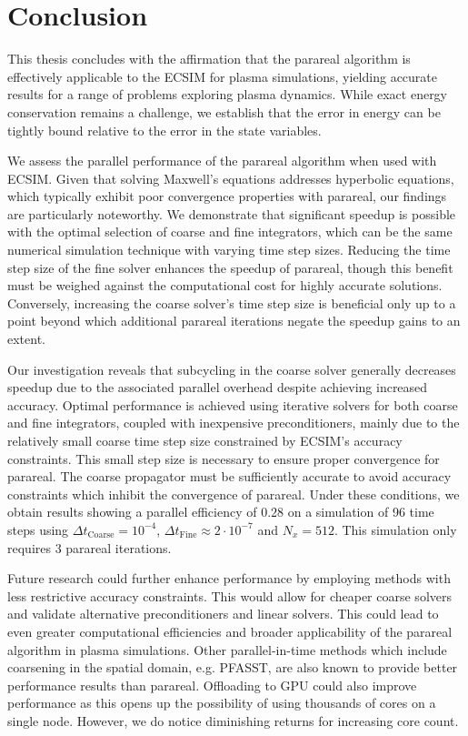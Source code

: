 \chapter{Conclusion}
\label{cha: conclusion}
This thesis concludes with the affirmation that the parareal algorithm is effectively applicable to the ECSIM for plasma simulations, yielding accurate results for a range of problems exploring plasma dynamics. While exact energy conservation remains a challenge, we establish that the error in energy can be tightly bound relative to the error in the state variables.

We assess the parallel performance of the parareal algorithm when used with ECSIM. Given that solving Maxwell's equations addresses hyperbolic equations, which typically exhibit poor convergence properties with parareal, our findings are particularly noteworthy. We demonstrate that significant speedup is possible with the optimal selection of coarse and fine integrators, which can be the same numerical simulation technique with varying time step sizes. Reducing the time step size of the fine solver enhances the speedup of parareal, though this benefit must be weighed against the computational cost for highly accurate solutions. Conversely, increasing the coarse solver's time step size is beneficial only up to a point beyond which additional parareal iterations negate the speedup gains to an extent.

Our investigation reveals that subcycling in the coarse solver generally decreases speedup due to the associated parallel overhead despite achieving increased accuracy. Optimal performance is achieved using iterative solvers for both coarse and fine integrators, coupled with inexpensive preconditioners, mainly due to the relatively small coarse time step size constrained by ECSIM's accuracy constraints. This small step size is necessary to ensure proper convergence for parareal. The coarse propagator must be sufficiently accurate to avoid accuracy constraints which inhibit the convergence of parareal. Under these conditions, we obtain results showing a parallel efficiency of $0.28$ on a simulation of 96 time steps using $\Delta t_\mathrm{Coarse} = 10^{-4}$, $\Delta t_\mathrm{Fine} \approx 2\cdot 10^{-7}$ and $N_x = 512$. This simulation only requires $3$ parareal iterations.

Future research could further enhance performance by employing methods with less restrictive accuracy constraints. This would allow for cheaper coarse solvers and validate alternative preconditioners and linear solvers. This could lead to even greater computational efficiencies and broader applicability of the parareal algorithm in plasma simulations. Other parallel-in-time methods which include coarsening in the spatial domain, e.g. PFASST, are also known to provide better performance results than parareal.
 Offloading to GPU could also improve performance as this opens up the possibility of using thousands of cores on a single node. However, we do notice diminishing returns for increasing core count.

